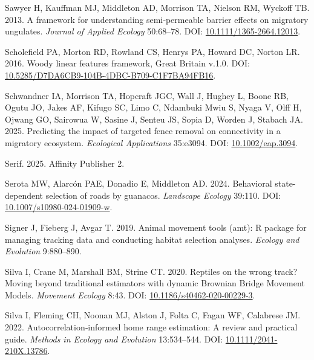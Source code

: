 \documentclass[10pt,a4paper]{article}
\newlength{\cslhangindent}
\newenvironment{CSLReferences}[2] %
 {\begin{list}{}{%
  \setlength{\itemindent}{0pt}
  \setlength{\leftmargin}{0pt}
  \setlength{\parsep}{0pt}
  \ifodd #1
   \setlength{\leftmargin}{\cslhangindent}
   \setlength{\itemindent}{-1\cslhangindent}
  \fi
  \setlength{\itemsep}{#2\baselineskip}}}
 {\end{list}}
\begin{document}
\begin{CSLReferences}{1}{0}
Sawyer H, Kauffman MJ, Middleton AD, Morrison TA, Nielson RM, Wyckoff TB. 2013. A framework for understanding semi‐permeable barrier effects on migratory ungulates. \emph{Journal of Applied Ecology} 50:68--78. DOI: \href{https://doi.org/10.1111/1365-2664.12013}{10.1111/1365-2664.12013}.

Scholefield PA, Morton RD, Rowland CS, Henrys PA, Howard DC, Norton LR. 2016. Woody linear features framework, {Great} {Britain} v.1.0. DOI: \href{https://doi.org/10.5285/D7DA6CB9-104B-4DBC-B709-C1F7BA94FB16}{10.5285/D7DA6CB9-104B-4DBC-B709-C1F7BA94FB16}.

Schwandner IA, Morrison TA, Hopcraft JGC, Wall J, Hughey L, Boone RB, Ogutu JO, Jakes AF, Kifugo SC, Limo C, Ndambuki Mwiu S, Nyaga V, Olff H, Ojwang GO, Sairowua W, Sasine J, Senteu JS, Sopia D, Worden J, Stabach JA. 2025. Predicting the impact of targeted fence removal on connectivity in a migratory ecosystem. \emph{Ecological Applications} 35:e3094. DOI: \href{https://doi.org/10.1002/eap.3094}{10.1002/eap.3094}.

Serif. 2025. Affinity {Publisher} 2.

Serota MW, Alarcón PAE, Donadio E, Middleton AD. 2024. Behavioral state-dependent selection of roads by guanacos. \emph{Landscape Ecology} 39:110. DOI: \href{https://doi.org/10.1007/s10980-024-01909-w}{10.1007/s10980-024-01909-w}.

Signer J, Fieberg J, Avgar T. 2019. Animal movement tools (amt): R package for managing tracking data and conducting habitat selection analyses. \emph{Ecology and Evolution} 9:880--890.

Silva I, Crane M, Marshall BM, Strine CT. 2020. Reptiles on the wrong track? {Moving} beyond traditional estimators with dynamic {Brownian} {Bridge} {Movement} {Models}. \emph{Movement Ecology} 8:43. DOI: \href{https://doi.org/10.1186/s40462-020-00229-3}{10.1186/s40462-020-00229-3}.

Silva I, Fleming CH, Noonan MJ, Alston J, Folta C, Fagan WF, Calabrese JM. 2022. Autocorrelation‐informed home range estimation: {A} review and practical guide. \emph{Methods in Ecology and Evolution} 13:534--544. DOI: \href{https://doi.org/10.1111/2041-210X.13786}{10.1111/2041-210X.13786}.


\end{CSLReferences}
\end{document}
